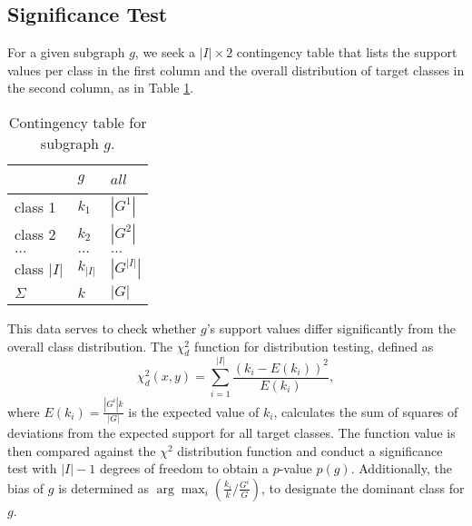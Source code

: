 \documentclass{sig-alternate}
\begin{document}
\subsection{Significance Test}
\label{ss:significance-test}
For a given subgraph $g$, we seek a $|I| \times 2$ contingency table that lists the
support values per class in the first column and the overall distribution of target
classes in the second column, as in Table \ref{t-ContingencyTableIndTest}.
\begin{table}[t]
  \centering
  \begin{tabular}{|l|l|l|}
    \hline
    ~           &	$g$       & $all$       \\\hline
    class 1	    &	$k_1$     & $|G^1|$     \\\hline
    class 2 	  &	$k_2$     & $|G^2|$     \\\hline
    $\ldots$ 	  &	$\ldots$  & $\ldots$    \\\hline
    class $|I|$	&	$k_{|I|}$ & $|G^{|I|}|$ \\\hline
    $\Sigma$	  &	$k$       & $|G|$       \\\hline
  \end{tabular}
  \caption[]{Contingency table for subgraph $g$.}
  \label{t-ContingencyTableIndTest}
\end{table}
This data serves to check whether $g$'s support values differ
significantly from the overall class distribution.  The $\chi^2_d$ function for
distribution testing, defined as
\begin{equation}
  \chi^2_d(x,y) = \sum_{i=1}^{|I|} \frac{(k_i-E(k_i))^2}{E(k_i)},
  \label{eq:chid}
\end{equation} 
where $E(k_i)=\frac{|G^{i}| k}{|G|}$ is the expected value of $k_i$, calculates
the sum of squares of deviations from the expected support for all target
classes. The function value is then compared against the $\chi^2$
distribution function and conduct a significance test with
$|I|-1$ degrees of freedom to obtain a $p$-value $p(g)$.  
Additionally, the bias of $g$ is determined as $\arg\max_i (\frac{k_i}{k}/\frac{G^i}{G})$, to designate the dominant class for $g$.
\end{document}

